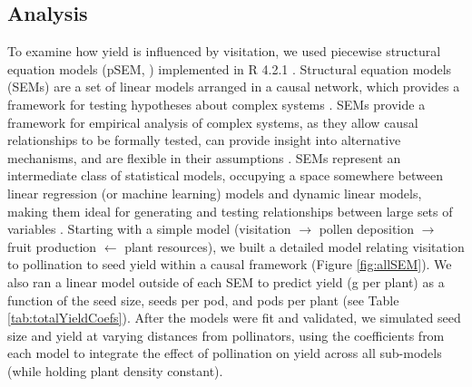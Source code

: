 \documentclass[12pt]{article} %
\begin{document}
\subsection*{Analysis}
To examine how yield is influenced by visitation, we used piecewise structural equation models (pSEM, \citealp{shipley2009}) implemented in R 4.2.1 \citep{Rcore}.
Structural equation models (SEMs) are a set of linear models arranged in a causal network, which provides a framework for testing hypotheses about complex systems \citep{grace2012, lefcheck2015}.
SEMs provide a framework for empirical analysis of complex systems, as they allow causal relationships to be formally tested, can provide insight into alternative mechanisms, and are flexible in their assumptions \citep{shipley2009,clough2012, grace2012}.
SEMs represent an intermediate class of statistical models, occupying a space somewhere between linear regression (or machine learning) models and dynamic linear models, making them ideal for generating and testing relationships between large sets of variables \citep{grace2006, kline2013}. 
Starting with a simple model (visitation $\rightarrow$ pollen deposition $\rightarrow$ fruit production $\leftarrow$ plant resources), we built a detailed model relating visitation to pollination to seed yield within a causal framework (Figure \ref{fig:allSEM}).
We also ran a linear model outside of each SEM to predict yield (g per plant) as a function of the seed size, seeds per pod, and pods per plant (see Table \ref{tab:totalYieldCoefs}).
After the models were fit and validated, we simulated seed size and yield at varying distances from pollinators, using the coefficients from each model to integrate the effect of pollination on yield across all sub-models (while holding plant density constant).
\end{document}
